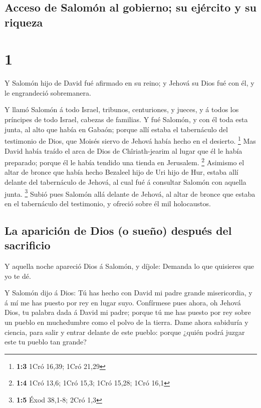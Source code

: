 \hypertarget{acceso-de-salomuxf3n-al-gobierno-su-ejuxe9rcito-y-su-riqueza}{%
\subsection{Acceso de Salomón al gobierno; su ejército y su
riqueza}\label{acceso-de-salomuxf3n-al-gobierno-su-ejuxe9rcito-y-su-riqueza}}

\hypertarget{section}{%
\section{1}\label{section}}

 Y Salomón hijo de David fué afirmado en su reino; y
Jehová su Dios fué con él, y le engrandeció sobremanera.

 Y llamó Salomón á todo Israel, tribunos, centuriones, y
jueces, y á todos los príncipes de todo Israel, cabezas de familias.
 Y fué Salomón, y con él toda esta junta, al alto que
había en Gabaón; porque allí estaba el tabernáculo del testimonio de
Dios, que Moisés siervo de Jehová había hecho en el desierto.
\footnote{\textbf{1:3} 1Cró 16,39; 1Cró 21,29}  Mas David
había traído el arca de Dios de Chîriath-jearim al lugar que él le había
preparado; porque él le había tendido una tienda en Jerusalem.
\footnote{\textbf{1:4} 1Cró 13,6; 1Cró 15,3; 1Cró 15,28; 1Cró 16,1}
 Asimismo el altar de bronce que había hecho Bezaleel hijo
de Uri hijo de Hur, estaba allí delante del tabernáculo de Jehová, al
cual fué á consultar Salomón con aquella junta. \footnote{\textbf{1:5}
  Éxod 38,1-8; 2Cró 1,3}  Subió pues Salomón allá delante
de Jehová, al altar de bronce que estaba en el tabernáculo del
testimonio, y ofreció sobre él mil holocaustos.

\hypertarget{la-apariciuxf3n-de-dios-o-sueuxf1o-despuuxe9s-del-sacrificio}{%
\subsection{La aparición de Dios (o sueño) después del
sacrificio}\label{la-apariciuxf3n-de-dios-o-sueuxf1o-despuuxe9s-del-sacrificio}}

 Y aquella noche apareció Dios á Salomón, y díjole:
Demanda lo que quisieres que yo te dé.

 Y Salomón dijo á Dios: Tú has hecho con David mi padre
grande misericordia, y á mí me has puesto por rey en lugar suyo.
 Confírmese pues ahora, oh Jehová Dios, tu palabra dada á
David mi padre; porque tú me has puesto por rey sobre un pueblo en
muchedumbre como el polvo de la tierra.  Dame ahora
sabiduría y ciencia, para salir y entrar delante de este pueblo: porque
¿quién podrá juzgar este tu pueblo tan grande?

